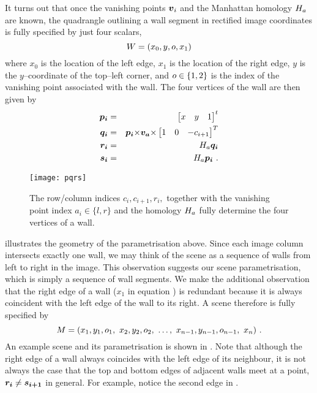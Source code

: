 It turns out that once the vanishing points $\vpt_i$ and the Manhattan
homology $\Hcf$ are known, the quadrangle outlining a wall segment in
rectified image coordinates is fully specified by just four scalars,
\begin{equation}
  \label{eq:wall-def}
  \Wall = ( x_0, y, \WallOrient, x_1 )
\end{equation}
where $x_0$ is the location of the left edge, $x_1$ is the location of
the right edge, $y$ is the $y$--coordinate of the top--left corner, and
$\WallOrient\in\{1,2\}$ is the index of the vanishing point associated with
the wall. The four vertices of the wall are then given by
\begin{eqnarray}
  \label{eq:pi}
  \vect{p_i} &=& \begin{bmatrix}x&y&1\end{bmatrix}^t \\
  \label{eq:qi}
  \vect{q_i} &=& \vect{p_i}\cross\vect{v_{a}}\cross
               \begin{bmatrix}1&0&-c_{i+1}\end{bmatrix}^T\\
  \label{eq:ri}
  \vect{r_i} &=& \Hcf \vect{q_i}\\
  \label{eq:si}
  \vect{s_i} &=& \Hcf \vect{p_i} ~.
\end{eqnarray}

\begin{figure}[tb]%
  \centering
  \quad
  \texttt{[image: pqrs]}
  \caption{The row/column indices $c_i,c_{i+1},r_i,$ together with the
    vanishing point index $a_i\in\{l,r\}$ and the homology $\Hcf$
    fully determine the four vertices of a wall.}
  \label{fig:pqrs}
\end{figure}

 illustrates the geometry of the parametrisation
above. Since each image column intersects exactly one
wall, we may think of the scene as a sequence of walls from left to
right in the image. This observation suggests our scene
parametrisation, which is simply a sequence of wall segments. We make
the additional observation that the right edge of a wall ($x_1$ in
equation ) is redundant because it is always
coincident with the left edge of the wall to its right. A scene
therefore is fully specified by
\begin{equation}
  \Scene =
  ( x_1,y_1,\WallOrient_1,
   ~x_2,y_2,\WallOrient_2,
   ~\ldots,
   ~x_{n-1},y_{n-1},\WallOrient_{n-1},
   ~x_n ) ~.
  \label{eq:vertex-repr}
\end{equation}
An example scene and its parametrisation is shown in
. Note that although the right edge of a wall
always coincides with the left edge of its neighbour, it is not always
the case that the top and bottom edges of adjacent walls meet at a
point, \ie $\vect{r_i} \neq \vect{s_{i+1}}$ in general. For example,
notice the second edge in .

